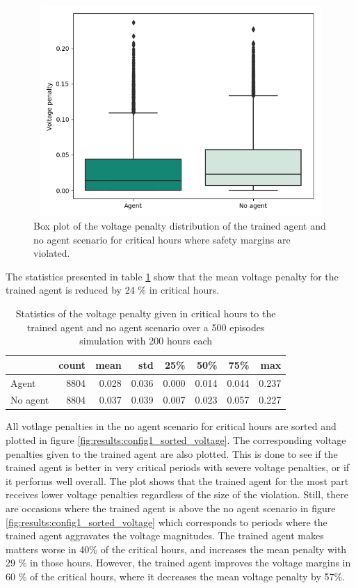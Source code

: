 \documentclass[class=book, crop=false, 11pt]{standalone}
\begin{document}
\begin{figure}[H]
    \center
\includegraphics[height=8cm, width=12cm]{figures/config1_voltage_boxplot.png}
    \caption {Box plot of the voltage penalty distribution of the trained agent and no agent scenario for critical hours where safety margins are violated.}
    \label{fig:results:config1_voltage_boxplot}
\end{figure}

The statistics presented in table \ref{table:results:configuration1_reward_500_ep_preventive} show that the mean voltage penalty for the trained agent is reduced by 24 \% in critical hours.


\begin{table}[h]
\center
\caption{Statistics of the voltage penalty given in critical hours to the trained agent and no agent scenario over a 500 episodes simulation with 200 hours each}
\begin{tabular}{l|rrrrrrr}
         & count    & mean  & std   & 25\%  & 50\%  & 75\%  & max   \\
\hline
Agent    & 8804 & 0.028 & 0.036 & 0.000 & 0.014 & 0.044 & 0.237 \\
No agent & 8804 & 0.037 & 0.039 & 0.007 & 0.023 & 0.057 & 0.227 \\
\hline
\end{tabular}
\label{table:results:configuration1_reward_500_ep_preventive}
\end{table}



All votlage penalties in the no agent scenario for critical hours are sorted and plotted in figure \ref{fig:results:config1_sorted_voltage}. The corresponding voltage penalties given to the trained agent are also plotted. This is done to see if the trained agent is better in very critical periods with severe voltage penalties, or if it performs well overall. The plot shows that the trained agent for the most part receives lower voltage penalties regardless of the size of the violation. Still, there are occasions where the trained agent is above the no agent scenario in figure \ref{fig:results:config1_sorted_voltage} which corresponds to periods where the trained agent aggravates the voltage magnitudes. The trained agent makes matters worse in 40\% of the critical hours, and increases the mean penalty with 29 \% in those hours. However, the trained agent improves the voltage margins in 60 \% of the critical hours, where it decreases the mean voltage penalty by 57\%.
\end{document}
